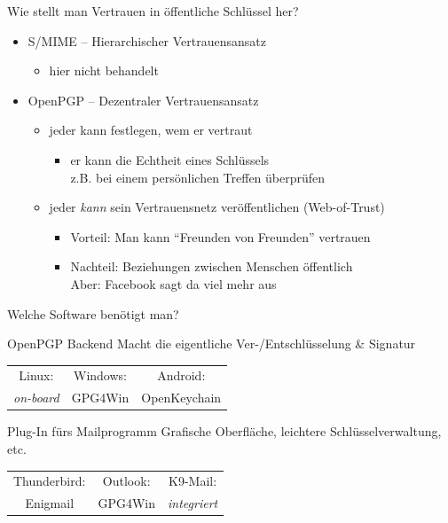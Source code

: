 \begin{frame}{Wie stellt man Vertrauen in öffentliche Schlüssel her?}
  \begin{itemize}
    \item S/MIME -- Hierarchischer Vertrauensansatz
    \begin{itemize}
      \item hier nicht behandelt
    \end{itemize}
    \item OpenPGP -- Dezentraler Vertrauensansatz
    \begin{itemize}
      \item jeder kann festlegen, wem er vertraut
      \begin{itemize}
        \item er kann die Echtheit eines Schlüssels\\ z.B. bei einem persönlichen Treffen überprüfen
      \end{itemize}
      \item jeder \emph{kann} sein Vertrauensnetz veröffentlichen (Web-of-Trust)
      \begin{itemize}
        \item Vorteil: Man kann ``Freunden von Freunden'' vertrauen
        \item Nachteil: Beziehungen zwischen Menschen öffentlich\\ Aber: Facebook sagt da viel mehr aus
      \end{itemize}
    \end{itemize}
  \end{itemize}
\end{frame}

\begin{frame}{Welche Software benötigt man?}
  \begin{block}{OpenPGP Backend}
    Macht die eigentliche Ver-/Entschlüsselung \& Signatur

    \vspace{1ex}
    \begin{tabular}{ccc}
      Linux:            & Windows: & Android:     \\
      \textit{on-board} & GPG4Win  & OpenKeychain \\
    \end{tabular}
  \end{block}
  \begin{block}{Plug-In fürs Mailprogramm}
    Grafische Oberfläche, leichtere Schlüsselverwaltung, etc.

    \vspace{1ex}
    \begin{tabular}{ccc}
      Thunderbird: & Outlook: & K9-Mail: \\
      Enigmail     & GPG4Win  & \textit{integriert} \\
    \end{tabular}
  \end{block}
\end{frame}

\endinput
